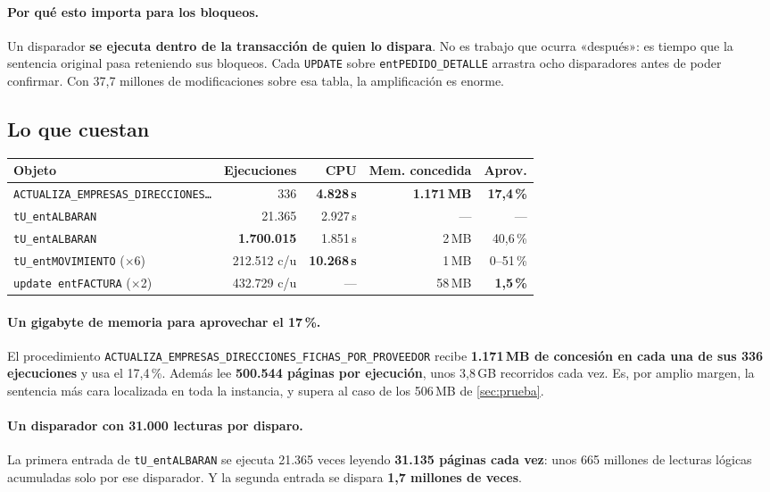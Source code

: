 \documentclass[11pt,a4paper]{article}
\newcommand{\cod}[1]{\texttt{\small #1}}
\newcommand{\critico}[1]{\textcolor{rojo}{\textbf{#1}}}
\begin{document}
\paragraph{Por qué esto importa para los bloqueos.} Un disparador
\textbf{se ejecuta dentro de la transacción de quien lo dispara}. No es
trabajo que ocurra «después»: es tiempo que la sentencia original pasa
reteniendo sus bloqueos. Cada \cod{UPDATE} sobre \cod{entPEDIDO\_DETALLE}
arrastra ocho disparadores antes de poder confirmar. Con 37,7 millones de
modificaciones sobre esa tabla, la amplificación es enorme.

\subsection{Lo que cuestan}

\begin{table}[h]
\centering
\small
\begin{tabular}{lrrrr}
\toprule
\textbf{Objeto} & \textbf{Ejecuciones} & \textbf{CPU} &
\textbf{Mem. concedida} & \textbf{Aprov.} \\
\midrule
\cod{ACTUALIZA\_EMPRESAS\_DIRECCIONES\ldots} & 336 & \critico{4.828\,s} &
  \critico{1.171\,MB} & \critico{17,4\,\%} \\
\cod{tU\_entALBARAN} & 21.365 & 2.927\,s & --- & --- \\
\cod{tU\_entALBARAN} & \critico{1.700.015} & 1.851\,s & 2\,MB & 40,6\,\% \\
\cod{tU\_entMOVIMIENTO} ($\times$6) & 212.512 c/u & \critico{10.268\,s} & 1\,MB &
  0--51\,\% \\
\cod{update entFACTURA} ($\times$2) & 432.729 c/u & --- & 58\,MB & \critico{1,5\,\%} \\
\bottomrule
\end{tabular}
\end{table}

\paragraph{Un gigabyte de memoria para aprovechar el 17\,\%.} El
procedimiento \cod{ACTUALIZA\_EMPRESAS\_DIRECCIONES\_FICHAS\_POR\_PROVEEDOR}
recibe \textbf{1.171\,MB de concesión en cada una de sus 336 ejecuciones} y
usa el 17,4\,\%. Además lee \textbf{500.544 páginas por ejecución}, unos
3,8\,GB recorridos cada vez. Es, por amplio margen, la sentencia más cara
localizada en toda la instancia, y supera al caso de los 506\,MB de
\ref{sec:prueba}.

\paragraph{Un disparador con 31.000 lecturas por disparo.} La primera entrada
de \cod{tU\_entALBARAN} se ejecuta 21.365 veces leyendo \textbf{31.135
páginas cada vez}: unos 665 millones de lecturas lógicas acumuladas solo por
ese disparador. Y la segunda entrada se dispara \textbf{1,7 millones de
veces}.
\end{document}
